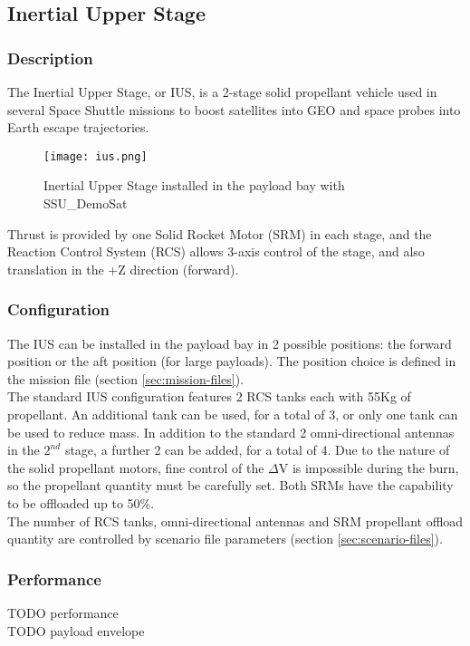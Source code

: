 \documentclass[Space_Shuttle_Ultra_Manual.tex]{subfiles}
\begin{document}
\subsection{Inertial Upper Stage}
\begin{multicols*}{2}
\renewcommand{\cfttoctitlefont}{\bf}
\localtableofcontents
\subsubsection{Description}
\noindent
The Inertial Upper Stage, or IUS, is a 2-stage solid propellant vehicle used in several Space Shuttle missions to boost satellites into GEO and space probes into Earth escape trajectories.
\\
\begin{figure}[H]
	\centering
	\captionsetup{justification=centering}
  \texttt{[image: ius.png]}
  \caption{Inertial Upper Stage installed in the payload bay with SSU\_DemoSat}
  \label{fig:ius}
\end{figure}

Thrust is provided by one Solid Rocket Motor (SRM) in each stage, and the Reaction Control System (RCS) allows 3-axis control of the stage, and also translation in the +Z direction (forward).\\

\subsubsection{Configuration}
The IUS can be installed in the payload bay in 2 possible positions: the forward position or the aft position (for large payloads). The position choice is defined in the mission file (section \ref{sec:mission-files}).\\
The standard IUS configuration features 2 RCS tanks each with 55Kg of propellant. An additional tank can be used, for a total of 3, or only one tank can be used to reduce mass. In addition to the standard 2 omni-directional antennas in the $2^{nd}$ stage, a further 2 can be added, for a total of 4. Due to the nature of the solid propellant motors, fine control of the $\Delta$V is impossible during the burn, so the propellant quantity must be carefully set. Both SRMs have the capability to be offloaded up to 50\%.\\
The number of RCS tanks, omni-directional antennas and SRM propellant offload quantity are controlled by scenario file parameters (section \ref{sec:scenario-files}).

\subsubsection{Performance}
TODO performance
\\
TODO payload envelope


\end{multicols*}
\end{document}
